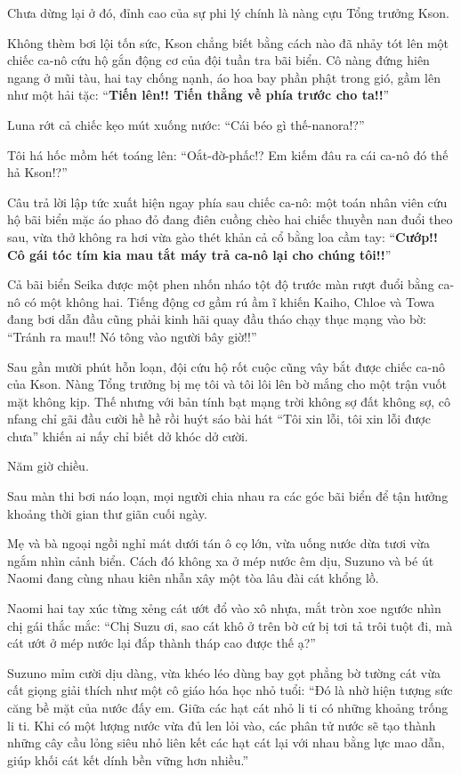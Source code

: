 \documentclass[../main.tex]{subfiles}
\begin{document}
Chưa dừng lại ở đó, đỉnh cao của sự phi lý chính là nàng cựu Tổng trưởng Kson.

Không thèm bơi lội tốn sức, Kson chẳng biết bằng cách nào đã nhảy tót lên một chiếc ca-nô cứu hộ gắn động cơ của đội tuần tra bãi biển. Cô nàng đứng hiên ngang ở mũi tàu, hai tay chống nạnh, áo hoa bay phần phật trong gió, gầm lên như một hải tặc: ``\textbf{Tiến lên!! Tiến thẳng về phía trước cho ta!!}''

Luna rớt cả chiếc kẹo mút xuống nước: ``Cái béo gì thế-nanora!?''

Tôi há hốc mồm hét toáng lên: ``Oắt-đờ-phấc!? Em kiếm đâu ra cái ca-nô đó thế hả Kson!?''

Câu trả lời lập tức xuất hiện ngay phía sau chiếc ca-nô: một toán nhân viên cứu hộ bãi biển mặc áo phao đỏ đang điên cuồng chèo hai chiếc thuyền nan đuổi theo sau, vừa thở không ra hơi vừa gào thét khản cả cổ bằng loa cầm tay: ``\textbf{Cướp!! Cô gái tóc tím kia mau tắt máy trả ca-nô lại cho chúng tôi!!}''

Cả bãi biển Seika được một phen nhốn nháo tột độ trước màn rượt đuổi bằng ca-nô có một không hai. Tiếng động cơ gầm rú ầm ĩ khiến Kaiho, Chloe và Towa đang bơi dẫn đầu cũng phải kinh hãi quay đầu tháo chạy thục mạng vào bờ: ``Tránh ra mau!! Nó tông vào người bây giờ!!''

Sau gần mười phút hỗn loạn, đội cứu hộ rốt cuộc cũng vây bắt được chiếc ca-nô của Kson. Nàng Tổng trưởng bị mẹ tôi và tôi lôi lên bờ mắng cho một trận vuốt mặt không kịp. Thế nhưng với bản tính bạt mạng trời không sợ đất không sợ, cô nfang chỉ gãi đầu cười hề hề rồi huýt sáo bài hát ``Tôi xin lỗi, tôi xin lỗi được chưa'' khiến ai nấy chỉ biết dở khóc dở cười.

\ct

Năm giờ chiều.

Sau màn thi bơi náo loạn, mọi người chia nhau ra các góc bãi biển để tận hưởng khoảng thời gian thư giãn cuối ngày.

Mẹ và bà ngoại ngồi nghỉ mát dưới tán ô cọ lớn, vừa uống nước dừa tươi vừa ngắm nhìn cảnh biển. Cách đó không xa ở mép nước êm dịu, Suzuno và bé út Naomi đang cùng nhau kiên nhẫn xây một tòa lâu đài cát khổng lồ.

Naomi hai tay xúc từng xẻng cát ướt đổ vào xô nhựa, mắt tròn xoe ngước nhìn chị gái thắc mắc: ``Chị Suzu ơi, sao cát khô ở trên bờ cứ bị tơi tả trôi tuột đi, mà cát ướt ở mép nước lại đắp thành tháp cao được thế ạ?''

Suzuno mỉm cười dịu dàng, vừa khéo léo dùng bay gọt phẳng bờ tường cát vừa cất giọng giải thích như một cô giáo hóa học nhỏ tuổi: ``Đó là nhờ hiện tượng sức căng bề mặt của nước đấy em. Giữa các hạt cát nhỏ li ti có những khoảng trống li ti. Khi có một lượng nước vừa đủ len lỏi vào, các phân tử nước sẽ tạo thành những cây cầu lỏng siêu nhỏ liên kết các hạt cát lại với nhau bằng lực mao dẫn, giúp khối cát kết dính bền vững hơn nhiều.''
\end{document}

